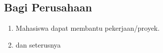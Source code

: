 \subsection{Bagi Perusahaan}
\begin{enumerate}[label=\alph*.]
  \item Mahasiswa dapat membantu pekerjaan/proyek.
  \item dan seterusnya
\end{enumerate}
